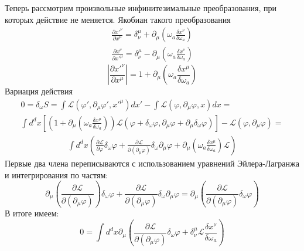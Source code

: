 \documentclass[a4paper,12pt]{article}
\theoremstyle{definition}
\theoremstyle{definition}
\theoremstyle{definition}
\begin{document}
Теперь рассмотрим произвольные инфинитезимальные преобразования, при которых действие не меняется.
Якобиан такого преобразования
\begin{eqnarray*}
  \frac{\partial x'^{\nu}}{\partial x^{\mu}} = \delta^{\mu}_{\nu}+\partial_{\mu}\left(\omega_a \frac{\delta x^{\nu}}{\delta \omega_a}\right)\\
  \frac{\partial x^{\nu}}{\partial x'^{\mu}} = \delta^{\mu}_{\nu}-\partial_{\mu}\left(\omega_a \frac{\delta x^{\nu}}{\delta \omega_a}\right)
\end{eqnarray*}
\begin{equation*}
  \left|\frac{\partial x'^{\nu}}{\partial x^{\mu}}\right| = 1+\partial_{\mu}\left(\omega_a \frac{\delta x^{\mu}}{\delta \omega_a}\right)
\end{equation*}
Вариация действия
\begin{multline*}
  0=\delta_{\omega} S=\int \mathcal{L}(\varphi',\partial_{\mu}\varphi',x'^{\mu})dx'-\int \mathcal{L}(\varphi,\partial_{\mu}\varphi,x)dx=\\
  \int d^{d}x\left[ \left( 1+\partial_{\mu}\left(\omega_a \frac{\delta x^{\mu}}{\delta \omega_a}\right)\right) \mathcal{L} \left(\varphi+\delta_{\omega}\varphi,
    \partial_{\mu}\varphi+\partial_{\mu}\delta_{\omega}\varphi\right)\right]-\mathcal{L}(\varphi,\partial_{\mu}\varphi)=
\end{multline*}
\begin{multline*}
      \int d^{d}x\left( \frac{\partial \mathcal{L}}{\partial \varphi} \delta_{\omega}\varphi +\frac{\partial \mathcal{L}}{\partial(\partial_{\mu}\varphi)}\delta_{\omega}\partial_{\mu}\varphi +\partial_{\mu}\left(\omega_a \frac{\delta x^{\mu}}{\delta \omega_a}\right)\mathcal{L}\right)
\end{multline*}
Первые два члена переписываются с использованием уравнений Эйлера-Лагранжа и интегрирования по частям:
\begin{equation*}
  \partial_{\mu}\left(\frac{\partial \mathcal{L}}{\partial (\partial_{\mu}\varphi)}\right)\delta_{\omega}\varphi+\frac{\partial \mathcal{L}}{\partial (\partial_{\mu}\varphi)}\delta_{\omega}\partial_{\mu}\varphi=
    \partial_{\mu}\left(\frac{\partial \mathcal{L}}{\partial(\partial_{\mu}\varphi)}\delta_{\omega}\varphi\right)
\end{equation*}
В итоге имеем:
\begin{equation*}
  0=\int d^{d}x \partial_{\mu}\left(\frac{\partial \mathcal{L}}{\partial(\partial_{\mu}\varphi)}\delta_{\omega}\varphi +\delta^{\mu}_{\nu}\mathcal{L} \frac{\delta x^{\nu}}{\delta \omega_{a}}\right)
\end{equation*}
\end{document}
